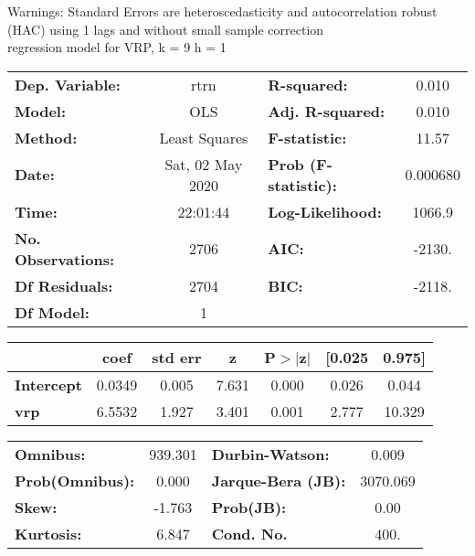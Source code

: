 Warnings: \newline
 [1] Standard Errors are heteroscedasticity and autocorrelation robust (HAC) using 1 lags and without small sample correction\\ 

regression model for VRP, k = 9 h = 1\begin{center}
\begin{tabular}{lclc}
\toprule
\textbf{Dep. Variable:}    &       rtrn       & \textbf{  R-squared:         } &     0.010   \\
\textbf{Model:}            &       OLS        & \textbf{  Adj. R-squared:    } &     0.010   \\
\textbf{Method:}           &  Least Squares   & \textbf{  F-statistic:       } &     11.57   \\
\textbf{Date:}             & Sat, 02 May 2020 & \textbf{  Prob (F-statistic):} &  0.000680   \\
\textbf{Time:}             &     22:01:44     & \textbf{  Log-Likelihood:    } &    1066.9   \\
\textbf{No. Observations:} &        2706      & \textbf{  AIC:               } &    -2130.   \\
\textbf{Df Residuals:}     &        2704      & \textbf{  BIC:               } &    -2118.   \\
\textbf{Df Model:}         &           1      & \textbf{                     } &             \\
\bottomrule
\end{tabular}
\begin{tabular}{lcccccc}
                   & \textbf{coef} & \textbf{std err} & \textbf{z} & \textbf{P$> |$z$|$} & \textbf{[0.025} & \textbf{0.975]}  \\
\midrule
\textbf{Intercept} &       0.0349  &        0.005     &     7.631  &         0.000        &        0.026    &        0.044     \\
\textbf{vrp}       &       6.5532  &        1.927     &     3.401  &         0.001        &        2.777    &       10.329     \\
\bottomrule
\end{tabular}
\begin{tabular}{lclc}
\textbf{Omnibus:}       & 939.301 & \textbf{  Durbin-Watson:     } &    0.009  \\
\textbf{Prob(Omnibus):} &   0.000 & \textbf{  Jarque-Bera (JB):  } & 3070.069  \\
\textbf{Skew:}          &  -1.763 & \textbf{  Prob(JB):          } &     0.00  \\
\textbf{Kurtosis:}      &   6.847 & \textbf{  Cond. No.          } &     400.  \\
\bottomrule
\end{tabular}
\end{center}

